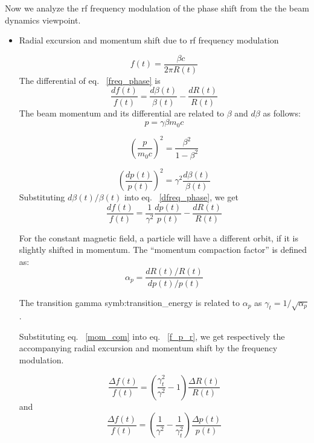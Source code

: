 Now we analyze the rf frequency modulation of the phase shift from the the beam dynamics viewpoint.
\begin{itemize}
	\item Radial excursion and momentum shift due to rf frequency modulation

\begin{equation}
f(t)=\frac{\beta c}{2\pi R(t)} \label{freq_phase}
\end{equation}
The differential of eq. ~\ref{freq_phase} is
\begin{equation}
\frac{df(t)}{f(t)}=\frac{d\beta(t)}{\beta(t)}-\frac{dR(t)}{R(t)} \label{dfreq_phase}
\end{equation}
The beam momentum and its differential are related to $\beta$ and $d\beta$ as follows: 
\begin{equation}
p=\gamma \beta m_0c
\end{equation}

\begin{equation}
(\frac{p}{m_0c})^2=\frac{\beta^2}{1-\beta^2}
\end{equation}

\begin{equation}
(\frac{dp(t)}{p(t)})^2=\gamma^2\frac{d\beta(t)}{\beta(t)}
\end{equation}
Substituting $d\beta(t)/\beta(t)$ into eq. ~\ref{dfreq_phase}, we get 
\begin{equation}
\frac{df(t)}{f(t)}=\frac{1}{\gamma^2}\frac{dp(t)}{p(t)}-\frac{dR(t)}{R(t)}\label{f_p_r}
\end{equation} 

For the constant magnetic field, a particle will have a different orbit, if it is slightly shifted in momentum. The “momentum compaction factor” is defined as:
\begin{equation}
\alpha_p=\frac{dR(t)/R(t)}{dp(t)/p(t)}\label{mom_com}
\end{equation} 

The transition gamma \gls{symb:transition_energy} is related to $\alpha_p$ as $\gamma_t=1/\sqrt{\alpha_p}$.

Substituting eq. ~\ref{mom_com} into eq. ~\ref{f_p_r}, we get respectively the accompanying radial excursion and momentum shift by the frequency modulation.

\begin{equation}
\label{eq:phaseR}
\frac{\Delta{f(t)}}{f(t)} =({\frac{\gamma_t^2}{\gamma^2}-1}) \frac{\Delta{R(t)}}{R(t)}
\end{equation}
and
\begin{equation}
\frac{\Delta{f(t)}}{f(t)} = (\frac{1}{\gamma^2}-\frac{1}{\gamma_t^2})\frac{\Delta{p(t)}}{p(t)}
\label{eq:phaseP}
\end{equation}


\end{itemize}
